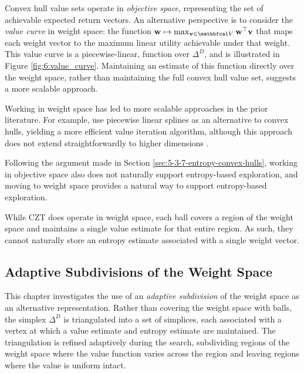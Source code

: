     Convex hull value sets operate in \textit{objective space}, 
    representing the set of achievable expected return vectors. 
    An alternative perspective is to consider the 
    \textit{value curve} in weight space: the function 
    $\bff{w} \mapsto \max_{\bff{v}\in\bfcl{V}} 
    \bff{w}^\top\bff{v}$ that maps each weight vector to the 
    maximum linear utility achievable under that weight. This 
    value curve is a piecewise-linear,  function over 
    $\Delta^D$, and is illustrated in Figure 
    \ref{fig:6:value_curve}. Maintaining an estimate of this 
    function directly over the weight space, rather than 
    maintaining the full convex hull value set, suggests a 
    more scalable approach. 
    
    Working in weight space has led to more scalable approaches in the prior literature. For example, \citet{lizotte_spline_2d} use piecewise linear splines as an alternative to convex hulls, yielding a more efficient value iteration algorithm, although this approach does not extend straightforwardly to higher dimensions \cite{lizotte_spline_nd}.

    Following the argument made in Section \ref{sec:5-3-7-entropy-convex-hulls}, working in objective space also does not naturally support entropy-based exploration, and moving to weight space provides a natural way to support entropy-based exploration.

    While CZT does operate in weight space, each ball covers a region of the weight space and maintains a single value estimate for that entire region. As such, they cannot naturally store an entropy estimate associated with a single weight vector.

\subsection{Adaptive Subdivisions of the Weight Space}

    This chapter investigates the use of an \textit{adaptive 
    subdivision} of the weight space as an alternative 
    representation. Rather than covering the weight space 
    with balls, the simplex $\Delta^D$ is triangulated into 
    a set of simplices, each associated with a vertex at 
    which a value estimate and entropy estimate are 
    maintained. The triangulation is refined adaptively 
    during the search, subdividing regions of the weight 
    space where the value function varies across the region and leaving regions where the value is uniform intact.

